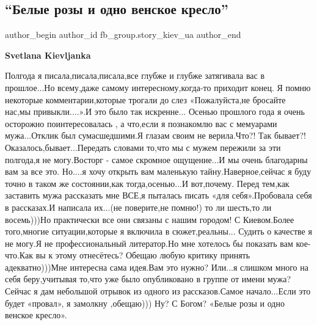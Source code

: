  
 
 
 
 
 
\subsection{\enquote{Белые розы и одно венское кресло}}
\label{sec:21_05_2021.fb.fb_group.story_kiev_ua.2.belye_rozy}
\ifcmt
 author_begin
   author_id fb_group.story_kiev_ua
 author_end
\fi

\textbf{Svetlana Kievljanka}

Полгода я писала,писала,писала,все глубже и глубже затягивала вас в прошлое...Но всему,даже самому интересному,когда-то приходит конец.
Я помню некоторые комментарии,которые трогали до слез «Пожалуйста,не бросайте нас,мы привыкли....».И это было так искренне...
Осенью прошлого года я очень осторожно поинтересовалась , а что,если я познакомлю вас с мемуарами мужа...Отклик был сумасшедшими.Я глазам своим не верила.Что?! Так бывает?! Оказалось,бывает...Передать словами то,что мы с мужем пережили за эти полгода,я не могу.Восторг - самое скромное ощущение...И мы очень благодарны вам за все это.
Но....я хочу открыть вам маленькую тайну.Наверное,сейчас я буду точно в таком же состоянии,как тогда,осенью...И вот,почему.
Перед тем,как заставить мужа рассказать мне ВСЕ,я пыталась писать «для себя».Пробовала себя в рассказах.И написала их...(не поверите,не помню!) то ли шесть,то ли восемь)))Но практически все они связаны с нашим городом! С Киевом.Более того,многие ситуации,которые я включила в сюжет,реальны...
Судить о качестве я не могу.Я не профессиональный литератор.Но мне хотелось бы показать вам кое-что.Как вы к этому отнесётесь? Обещаю любую критику принять адекватно)))Мне интересна сама идея.Вам это нужно? Или...я слишком много на себя беру,учитывая то,что уже было опубликовано в группе от имени мужа? 
Сейчас я дам небольшой отрывок из одного из рассказов.Самое начало...Если это будет «провал», я замолкну ,обещаю))) Ну? С Богом?
«Белые розы и одно венское кресло».


